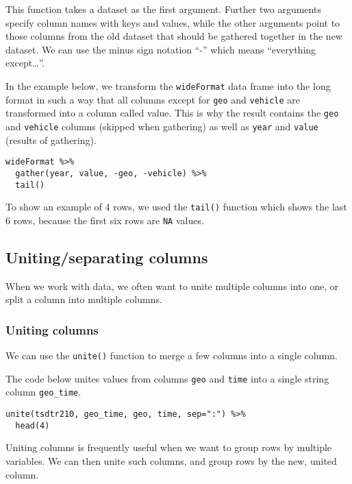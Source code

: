 \documentclass[]{book}
\theoremstyle{definition}
\theoremstyle{definition}
\theoremstyle{definition}
\theoremstyle{remark}
\begin{document}
This function takes a dataset as the first argument. Further two
arguments specify column names with keys and values, while the other
arguments point to those columns from the old dataset that should be
gathered together in the new dataset. We can use the minus sign notation
``-'' which means ``everything except\ldots{}''.

In the example below, we transform the \texttt{wideFormat} data frame
into the long format in such a way that all columns except for
\texttt{geo} and \texttt{vehicle} are transformed into a column called
value. This is why the result contains the \texttt{geo} and
\texttt{vehicle} columns (skipped when gathering) as well as
\texttt{year} and \texttt{value} (results of gathering).

\begin{verbatim}
wideFormat %>%
  gather(year, value, -geo, -vehicle) %>%
  tail()
\end{verbatim}

To show an example of 4 rows, we used the \texttt{tail()} function which
shows the last 6 rows, because the first six rows are \texttt{NA}
values.

\subsection{Uniting/separating columns}\label{part_258}

When we work with data, we often want to unite multiple columns into
one, or split a column into multiple columns.

\subsubsection*{Uniting columns}\label{uniting-columns}

We can use the \texttt{unite()} function to merge a few columns into a
single column.

The code below unites values from columns \texttt{geo} and \texttt{time}
into a single string column \texttt{geo\_time}.

\begin{verbatim}
unite(tsdtr210, geo_time, geo, time, sep=":") %>%
  head(4)
\end{verbatim}

Uniting columns is frequently useful when we want to group rows by
multiple variables. We can then unite such columns, and group rows by
the new, united column.
\end{document}
